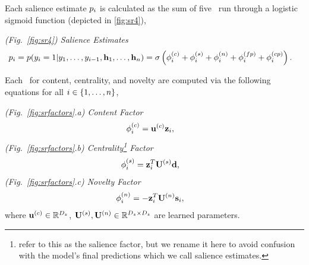 


Each salience estimate $p_i$ is calculated as the sum of five \saliencefactors~run through a logistic sigmoid function (depicted in \autoref{fig:sr4}),

\vspace{10pt}
    \noindent \textit{(Fig.~\ref{fig:sr4}) Salience Estimates}
\begin{align}
  p_i =  p(y_i=1|y_1,\dots,y_{i-1},\mathbf{h}_1,\ldots,\mathbf{h}_n)
         & = 
        \sigma\left(\phi^{(c)}_i 
        + \phi^{(s)}_i + \phi^{(n)}_i
    + \phi^{(fp)}_i + \phi^{(cp)}_i   \right).
\end{align}




%


\begin{wrapfigure}{r}{0.50\textwidth}
\end{wrapfigure}
Each \saliencefactors~for content, centrality, and novelty are computed
via the following equations for all $i \in \{1,\ldots,n\}$,

\vspace{10pt}
\noindent \textit{(Fig.~\ref{fig:srfactors}.a) Content Factor} 
\begin{align}
    \phi^{(c)}_i &=\mathbf{u}^{(c)} \mathbf{z}_i, 
\end{align}
\vspace{10pt}   \noindent \textit{(Fig.~\ref{fig:srfactors}.b) Centrality\footnote{\citet{nallapati2017summarunner} refer to this as the salience factor, but we rename it here to avoid confusion with the model's final predictions which we call salience estimates.} Factor}
\begin{align}
    \phi^{(s)}_i & = \mathbf{z}_i^T\mathbf{U}^{(s)} \mathbf{d}, 
\end{align}
\vspace{10pt} \noindent \textit{(Fig.~\ref{fig:srfactors}.c) Novelty Factor}
\begin{align}
    \phi^{(n)}_i &= -\mathbf{z}_i^T \mathbf{U}^{(n)} \mathbf{s}_i, \label{eq:srnov} 
\end{align}
where $\mathbf{u}^{(c)} \in \mathbb{R}^{{D_z}}$, $\mathbf{U}^{(s)},\mathbf{U}^{(n)} \in \mathbb{R}^{{D_z} \times {D_z}}$ are learned parameters.

